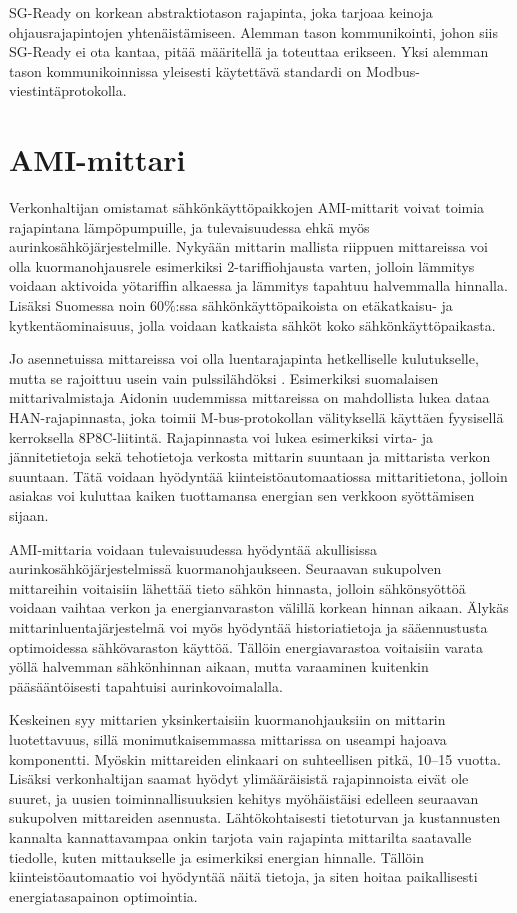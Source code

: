   SG-Ready on korkean abstraktiotason rajapinta, joka tarjoaa keinoja ohjausrajapintojen yhtenäistämiseen. Alemman tason kommunikointi, johon siis SG-Ready ei ota kantaa, pitää määritellä ja toteuttaa erikseen. Yksi alemman tason kommunikoinnissa yleisesti käytettävä standardi on Modbus-viestintäprotokolla.

\section{AMI-mittari}
  Verkonhaltijan omistamat sähkönkäyttöpaikkojen AMI-mittarit voivat toimia rajapintana lämpöpumpuille, ja tulevaisuudessa ehkä myös aurinkosähköjärjestelmille. Nykyään mittarin mallista riippuen mittareissa voi olla kuormanohjausrele esimerkiksi 2-tariffiohjausta varten, jolloin lämmitys voidaan aktivoida yötariffin alkaessa ja lämmitys tapahtuu halvemmalla hinnalla. Lisäksi Suomessa noin 60\%:ssa sähkönkäyttöpaikoista on etäkatkaisu- ja kytkentäominaisuus, jolla voidaan katkaista sähköt koko sähkönkäyttöpaikasta. \parencite{AMRNykytila}

  Jo asennetuissa mittareissa voi olla luentarajapinta hetkelliselle kulutukselle, mutta se rajoittuu usein vain pulssilähdöksi \parencite{Aidon5510}. Esimerkiksi suomalaisen mittarivalmistaja Aidonin uudemmissa mittareissa on mahdollista lukea dataa \gls{HAN}-rajapinnasta, joka toimii M-bus-protokollan välityksellä käyttäen fyysisellä kerroksella \gls{8P8C}-liitintä. Rajapinnasta voi lukea esimerkiksi virta- ja jännitetietoja sekä tehotietoja verkosta mittarin suuntaan ja mittarista verkon suuntaan. \parencite{HAN, NVEHAN} Tätä voidaan hyödyntää kiinteistöautomaatiossa mittaritietona, jolloin asiakas voi kuluttaa kaiken tuottamansa energian sen verkkoon syöttämisen sijaan.

  AMI-mittaria voidaan tulevaisuudessa hyödyntää akullisissa aurinkosähköjärjestelmissä kuormanohjaukseen. Seuraavan sukupolven mittareihin voitaisiin lähettää tieto sähkön hinnasta, jolloin sähkönsyöttöä voidaan vaihtaa verkon ja energianvaraston välillä korkean hinnan aikaan. Älykäs mittarinluentajärjestelmä voi myös hyödyntää historiatietoja ja sääennustusta optimoidessa sähkövaraston käyttöä. Tällöin energiavarastoa voitaisiin varata yöllä halvemman sähkönhinnan aikaan, mutta varaaminen kuitenkin pääsääntöisesti tapahtuisi aurinkovoimalalla. \parencite{AMRNykytila}

  Keskeinen syy mittarien yksinkertaisiin kuormanohjauksiin on mittarin luotettavuus, sillä monimutkaisemmassa mittarissa on useampi hajoava komponentti. Myöskin mittareiden elinkaari on suhteellisen pitkä, 10--15 vuotta. Lisäksi verkonhaltijan saamat hyödyt ylimääräisistä rajapinnoista eivät ole suuret, ja uusien toiminnallisuuksien kehitys myöhäistäisi edelleen seuraavan sukupolven mittareiden asennusta. Lähtökohtaisesti tietoturvan ja kustannusten kannalta kannattavampaa onkin tarjota vain rajapinta mittarilta saatavalle tiedolle, kuten mittaukselle ja esimerkiksi energian hinnalle. Tällöin kiinteistöautomaatio voi hyödyntää näitä tietoja, ja siten hoitaa paikallisesti energiatasapainon optimointia.
